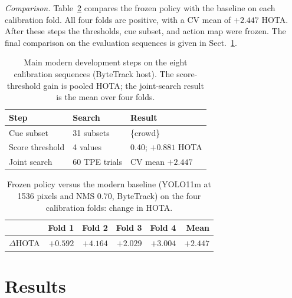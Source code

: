\documentclass[pdflatex,sn-mathphys-num,iicol]{sn-jnl}
\begin{document}
\emph{Comparison.} Table~\ref{tab:folds} compares the frozen policy with the
baseline on each calibration fold. All four folds are positive, with a CV
mean of $+2.447$ HOTA. After these steps the thresholds, cue subset, and
action map were frozen. The final comparison on the evaluation sequences is
given in Sect.~\ref{sec:results}.

\begin{table}[t]
\caption{Main modern development steps on the eight calibration sequences
(ByteTrack host). The score-threshold gain is pooled HOTA; the joint-search
result is the mean over four folds.}
\label{tab:devrecord}
\centering\footnotesize
\setlength{\tabcolsep}{3pt}
\begin{tabular}{@{}lll@{}}
\toprule
Step & Search & Result\\
\midrule
Cue subset & 31 subsets & \{crowd\}\\
Score threshold & 4 values & 0.40; $+0.881$ HOTA\\
Joint search & 60 TPE trials & CV mean $+2.447$\\
\bottomrule
\end{tabular}
\end{table}

\begin{table}[t]
\caption{Frozen policy versus the modern baseline (YOLO11m at 1536 pixels and
NMS 0.70, ByteTrack) on the four calibration folds: change in HOTA.}
\label{tab:folds}
\centering\footnotesize
\begin{tabular}{@{}lrrrrr@{}}
\toprule
 & Fold 1 & Fold 2 & Fold 3 & Fold 4 & Mean\\
\midrule
$\Delta$HOTA & $+0.592$ & $+4.164$ & $+2.029$ & $+3.004$ & $+2.447$\\
\bottomrule
\end{tabular}
\end{table}
\section{Results}\label{sec:results}
\end{document}
